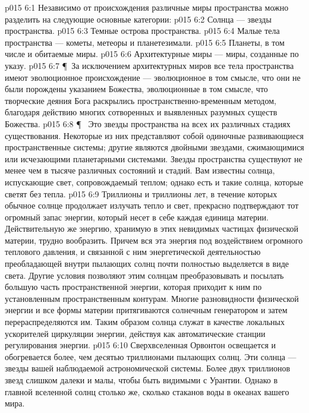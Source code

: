 \vs p015 6:1 Независимо от происхождения различные миры пространства можно разделить на следующие основные категории:
\vs p015 6:2 \bibnobreakspace Солнца --- звезды пространства.
\vs p015 6:3 \bibnobreakspace Темные острова пространства.
\vs p015 6:4 \bibnobreakspace Малые тела пространства --- кометы, метеоры и планетезимали.
\vs p015 6:5 \bibnobreakspace Планеты, в том числе и обитаемые миры.
\vs p015 6:6 \bibnobreakspace Архитектурные миры --- миры, созданные по указу.
\vs p015 6:7 \P\ За исключением архитектурных миров все тела пространства имеют эволюционное происхождение --- эволюционное в том смысле, что они не были порождены указанием Божества, эволюционные в том смысле, что творческие деяния Бога раскрылись пространственно\hyp{}временным методом, благодаря действию многих сотворенных и выявленных разумных существ Божества.
\vs p015 6:8 \P\  Это звезды пространства на всех их различных стадиях существования. Некоторые из них представляют собой одиночные развивающиеся пространственные системы; другие являются двойными звездами, сжимающимися или исчезающими планетарными системами. Звезды пространства существуют не менее чем в тысяче различных состояний и стадий. Вам известны солнца, испускающие свет, сопровождаемый теплом; однако есть и такие солнца, которые светят без тепла.
\vs p015 6:9 Триллионы и триллионы лет, в течение которых обычное солнце продолжает излучать тепло и свет, прекрасно подтверждают тот огромный запас энергии, который несет в себе каждая единица материи. Действительную же энергию, хранимую в этих невидимых частицах физической материи, трудно вообразить. Причем вся эта энергия под воздействием огромного теплового давления, и связанной с ним энергетической деятельностью преобладающей внутри пылающих солнц почти полностью выделяется в виде света. Другие условия позволяют этим солнцам преобразовывать и посылать большую часть пространственной энергии, которая приходит к ним по установленным пространственным контурам. Многие разновидности физической энергии и все формы материи притягиваются солнечным генератором и затем перераспределяются им. Таким образом солнца служат в качестве локальных ускорителей циркуляции энергии, действуя как автоматические станции регулирования энергии.
\vs p015 6:10 Сверхвселенная Орвонтон освещается и обогревается более, чем десятью триллионами пылающих солнц. Эти солнца --- звезды вашей наблюдаемой астрономической системы. Более двух триллионов звезд слишком далеки и малы, чтобы быть видимыми с Урантии. Однако в главной вселенной солнц столько же, сколько стаканов воды в океанах вашего мира.
